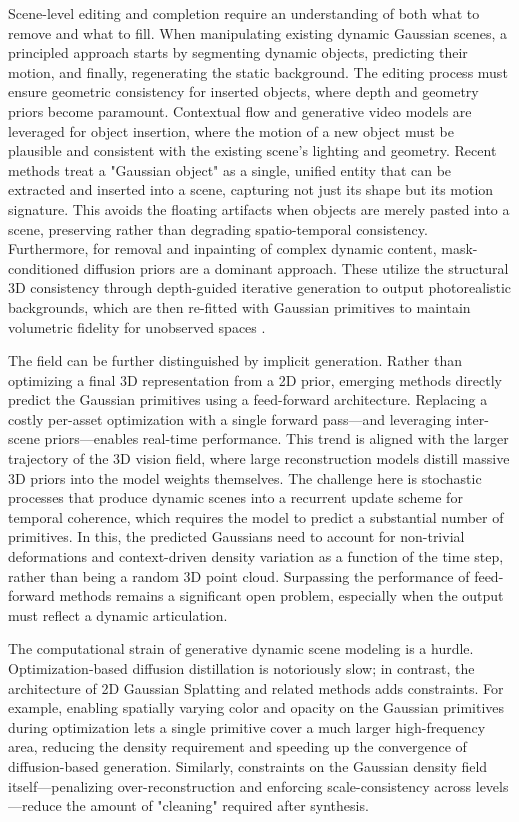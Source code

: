 \documentclass[11pt,a4paper]{article}
\begin{document}
Scene-level editing and completion require an understanding of both what to remove and what to fill. When manipulating existing dynamic Gaussian scenes, a principled approach starts by segmenting dynamic objects, predicting their motion, and finally, regenerating the static background. The editing process must ensure geometric consistency for inserted objects, where depth and geometry priors become paramount. Contextual flow and generative video models are leveraged for object insertion, where the motion of a new object must be plausible and consistent with the existing scene's lighting and geometry. Recent methods treat a "Gaussian object" as a single, unified entity that can be extracted and inserted into a scene, capturing not just its shape but its motion signature. This avoids the floating artifacts when objects are merely pasted into a scene, preserving rather than degrading spatio-temporal consistency. Furthermore, for removal and inpainting of complex dynamic content, mask-conditioned diffusion priors are a dominant approach. These utilize the structural 3D consistency through depth-guided iterative generation to output photorealistic backgrounds, which are then re-fitted with Gaussian primitives to maintain volumetric fidelity for unobserved spaces \cite{arxiv:2406.17074v1}.

The field can be further distinguished by implicit generation. Rather than optimizing a final 3D representation from a 2D prior, emerging methods directly predict the Gaussian primitives using a feed-forward architecture. Replacing a costly per-asset optimization with a single forward pass---and leveraging inter-scene priors---enables real-time performance. This trend is aligned with the larger trajectory of the 3D vision field, where large reconstruction models distill massive 3D priors into the model weights themselves. The challenge here is stochastic processes that produce dynamic scenes into a recurrent update scheme for temporal coherence, which requires the model to predict a substantial number of primitives. In this, the predicted Gaussians need to account for non-trivial deformations and context-driven density variation as a function of the time step, rather than being a random 3D point cloud. Surpassing the performance of feed-forward methods remains a significant open problem, especially when the output must reflect a dynamic articulation.

The computational strain of generative dynamic scene modeling is a hurdle. Optimization-based diffusion distillation is notoriously slow; in contrast, the architecture of 2D Gaussian Splatting and related methods adds constraints. For example, enabling spatially varying color and opacity on the Gaussian primitives \cite{arxiv:2411.18625v2} during optimization lets a single primitive cover a much larger high-frequency area, reducing the density requirement and speeding up the convergence of diffusion-based generation. Similarly, constraints on the Gaussian density field itself---penalizing over-reconstruction and enforcing scale-consistency across levels---reduce the amount of "cleaning" required after synthesis.
\end{document}
